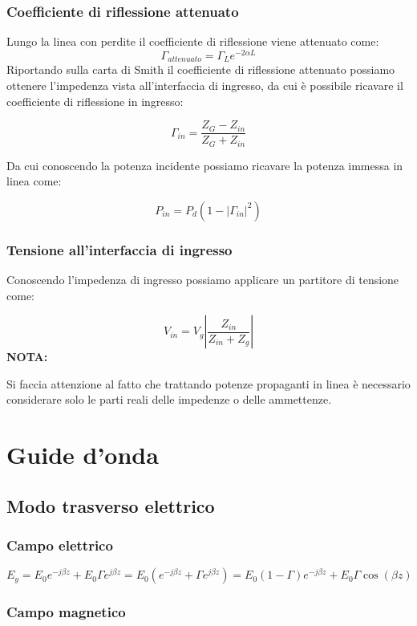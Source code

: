 \documentclass[10pt,a4paper]{report}
\begin{document}
		\subsection{Coefficiente di riflessione attenuato}
		Lungo la linea con perdite il coefficiente di riflessione viene attenuato come:
		\[
		\Gamma_{attenuato}=\Gamma_L e^{-2\alpha L}
		\]
		Riportando sulla carta di Smith il coefficiente di riflessione attenuato possiamo ottenere l'impedenza vista all'interfaccia di ingresso, da cui è possibile ricavare il coefficiente di riflessione in ingresso:

		\[
		\Gamma_{in}=\frac{Z_G-Z_{in}}{Z_G+Z_{in}}
		\]

		Da cui conoscendo la potenza incidente possiamo ricavare la potenza immessa in linea come:

		\[
		P_{in}=P_d(1-|\Gamma_{in}|^2)
		\]

		\subsection{Tensione all'interfaccia di ingresso}

		Conoscendo l'impedenza di ingresso possiamo applicare un partitore di tensione come:

		\[
		V_{in}=V_g|\frac{Z_{in}}{Z_{in}+Z_g}|
		\]
		\textbf{NOTA:}

		Si faccia attenzione al fatto che trattando potenze propaganti in linea è necessario considerare solo le parti reali delle impedenze o delle ammettenze.

\chapter{Guide d'onda}
		
	\section{Modo trasverso elettrico}

		\subsection{Campo elettrico}
				\begin{equation}
				E_y= E_0e^{-j\beta z}+E_0 \Gamma e^{j \beta z}=E_0(e^{-j \beta z}+\Gamma e^{j \beta z}) =E_0(1 - \Gamma)e^{-j \beta z} + E_0 \Gamma \cos(\beta z)
				\end{equation}

		\subsection{Campo magnetico}
\end{document}
